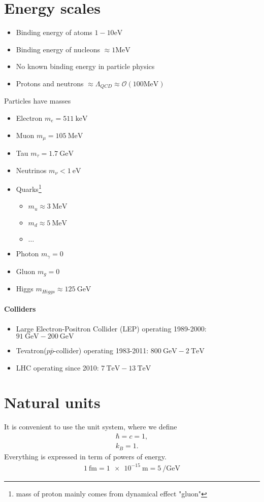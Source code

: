 \section{Energy scales}
\begin{itemize}
   \item Binding energy of atoms $1-10 \si{\eV}$
   \item Binding energy of nucleons $\approx 1 \si{\mega\eV}$
   \item No known binding energy in particle physics
   \item Protons and neutrons $\approx \Lambda_{QCD} \approx \mathcal{O} (100 \si{\mega\eV})$
\end{itemize}

Particles have masses
\begin{itemize}
   \item Electron $m_e = \SI{511}{\kilo\eV}$
   \item Muon $m_\mu = \SI{105}{\mega\eV}$
   \item Tau $m_\tau = \SI{1.7}{\giga\eV}$
   \item Neutrinos $m_\nu < \SI{1}{\eV}$ 
   \item Quarks\footnote{mass of proton mainly comes from dynamical effect "gluon"} 
      \begin{itemize}
         \item $m_u \approx \SI{3}{\mega\eV}$
         \item $m_d \approx \SI{5}{\mega\eV}$ 
         \item $\dots$
      \end{itemize}
   \item Photon $m_\gamma = 0$
   \item Gluon $m_g = 0$
   \item Higgs $m_{Higgs} \approx \SI{125}{\giga\eV}$
\end{itemize}

\paragraph{Colliders}
\begin{itemize}
   \item Large Electron-Positron Collider (LEP) operating 1989-2000: $\SI{91}{\giga\eV} - \SI{200}{\giga\eV}$
   \item Tevatron($p\bar{p}$-collider) operating 1983-2011: $\SI{800}{\giga\eV} - \SI{2}{\tera\eV}$
   \item LHC operating since 2010: $\SI{7}{\tera\eV} - \SI{13}{\tera\eV}$
\end{itemize}

\section{Natural units}
It is convenient to use the unit system, where we define
\begin{align}
   \hbar = c = 1, \\
   k_B = 1.
\end{align}
Everything is expressed in term of powers of energy.
\begin{align*}
   \SI{1}{\femto \m} = \SI{1e-15}{\m} = \SI{5}{\per\giga\eV}   
\end{align*}
